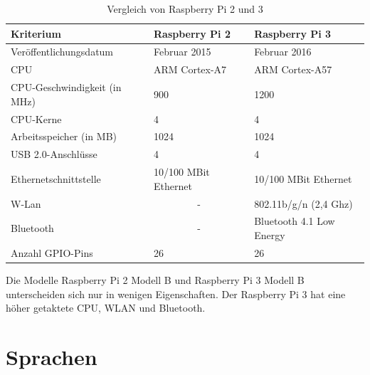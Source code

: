 \begin{table}[htb]
\centering
\caption{Vergleich von Raspberry Pi 2 und 3 \cite{CortexA7} \cite{CortexA57}}
\label{tab:VergleichRaspberry}
\begin{tabular}{l|l|l}
Kriterium                    & Raspberry Pi 2        					& Raspberry Pi 3           \\ \hline
Veröffentlichungsdatum       & Februar 2015          					& Februar 2016             \\ \hline
CPU                          & ARM Cortex-A7   								& ARM Cortex-A57           \\ \hline
CPU-Geschwindigkeit (in MHz) & 900             								& 1200                     \\ \hline
CPU-Kerne                    & 4                              & 4                        \\ \hline
Arbeitsspeicher (in MB)      & 1024                  					& 1024                     \\ \hline
USB 2.0-Anschlüsse           & 4                     					& 4                        \\ \hline
Ethernetschnittstelle        & 10/100 MBit Ethernet  					& 10/100 MBit Ethernet     \\ \hline
W-Lan                        & \multicolumn{1}{c}{-} 					& 802.11b/g/n (2,4 Ghz)    \\ \hline
Bluetooth                    & \multicolumn{1}{c}{-} 					& Bluetooth 4.1 Low Energy \\ \hline
Anzahl GPIO-Pins             & 26                    					& 26                       \\
\end{tabular}
\end{table}
 
Die Modelle Raspberry Pi 2 Modell B und Raspberry Pi 3 Modell B unterscheiden sich nur in wenigen Eigenschaften. Der Raspberry Pi 3 hat eine höher getaktete CPU, WLAN und Bluetooth.

\section{Sprachen}

